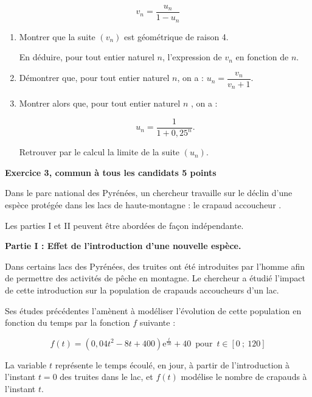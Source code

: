 \documentclass[11pt]{article}
\begin{document}
\begin{enumerate}
\[v_n  = \dfrac{u_n}{1 - u_n}\]

	\begin{enumerate}
		\item Montrer que la suite $\left(v_n\right)$ est géométrique de raison 4.
		
En déduire, pour tout entier naturel $n$, l'expression de $v_n$ en fonction de $n$.
		\item Démontrer que, pour tout entier naturel $n$, on a : $u_n = \dfrac{v_n}{v_n + 1}$. 
		\item Montrer alors que, pour tout entier naturel $n$ , on a : 
		
		\[u_n = \dfrac{1}{1 + 0,25^n}.\]

Retrouver par le calcul la limite de la suite $\left(u_n\right)$.
	\end{enumerate}
\end{enumerate}

\bigskip

\textbf{Exercice 3, commun à tous les candidats \hfill 5 points}

\medskip

Dans le parc national des Pyrénées, un chercheur travaille sur le déclin d'une espèce protégée dans les lacs de haute-montagne : le \og crapaud accoucheur \fg.

Les parties I et II peuvent être abordées de façon indépendante.

\begin{center}\textbf{Partie I : Effet de l'introduction d'une nouvelle espèce.}\end{center}

Dans certains lacs des Pyrénées, des truites ont été introduites par l'homme afin de permettre des activités de pêche en montagne. Le chercheur a étudié l'impact de cette introduction sur la
population de crapauds accoucheurs d'un lac.

Ses études précédentes l'amènent à modéliser l'évolution de cette population en fonction du temps par la fonction $f$ suivante : 

\[f(t) = \left(0,04t^2 - 8t + 400\right)\text{e}^{\frac{t}{50}} + 40 \, \text{ pour }\,  t \in [0~;~120]\]

La variable $t$ représente le temps écoulé, en jour, à partir de l'introduction à l'instant $t = 0$ des truites dans le lac, et $f(t)$ modélise le nombre de crapauds à l'instant $t$.

\medskip
\end{document}
